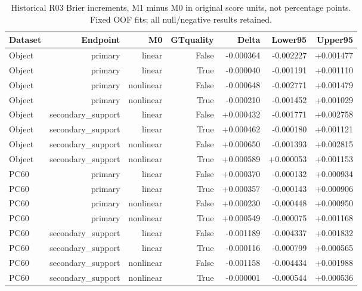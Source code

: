 \begin{table}[htbp]
\centering\scriptsize
\caption{Historical R03 Brier increments, M1 minus M0 in original score units, not percentage points. Fixed OOF fits; all null/negative results retained.}
\label{tab:r03-brier}
\setlength{\tabcolsep}{4pt}
\begin{tabular}{lrrrrrr}
\toprule
Dataset & Endpoint & M0 & GTquality & Delta & Lower95 & Upper95 \\
\midrule
Object & primary & linear & False & -0.000364 & -0.002227 & +0.001477 \\
Object & primary & linear & True & -0.000040 & -0.001191 & +0.001110 \\
Object & primary & nonlinear & False & -0.000648 & -0.002771 & +0.001479 \\
Object & primary & nonlinear & True & -0.000210 & -0.001452 & +0.001029 \\
Object & secondary\_support & linear & False & +0.000432 & -0.001771 & +0.002758 \\
Object & secondary\_support & linear & True & +0.000462 & -0.000180 & +0.001121 \\
Object & secondary\_support & nonlinear & False & +0.000650 & -0.001393 & +0.002815 \\
Object & secondary\_support & nonlinear & True & +0.000589 & +0.000053 & +0.001153 \\
PC60 & primary & linear & False & +0.000370 & -0.000132 & +0.000934 \\
PC60 & primary & linear & True & +0.000357 & -0.000143 & +0.000906 \\
PC60 & primary & nonlinear & False & +0.000230 & -0.000448 & +0.000950 \\
PC60 & primary & nonlinear & True & +0.000549 & -0.000075 & +0.001168 \\
PC60 & secondary\_support & linear & False & -0.001189 & -0.004337 & +0.001832 \\
PC60 & secondary\_support & linear & True & -0.000116 & -0.000799 & +0.000565 \\
PC60 & secondary\_support & nonlinear & False & -0.001158 & -0.004434 & +0.001988 \\
PC60 & secondary\_support & nonlinear & True & -0.000001 & -0.000544 & +0.000536 \\
\bottomrule
\end{tabular}
\end{table}
